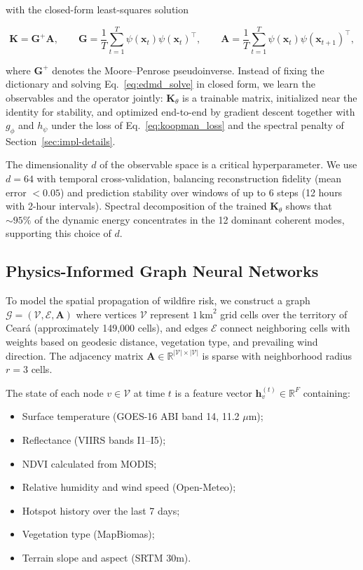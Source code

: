 \documentclass[preprint,12pt,times,numbers]{elsarticle}
\begin{document}
with the closed-form least-squares solution

\begin{equation}
\mathbf{K} = \mathbf{G}^{+} \mathbf{A}, \qquad
\mathbf{G} = \frac{1}{T}\sum_{t=1}^{T} \psi(\mathbf{x}_t)\psi(\mathbf{x}_t)^{\top}, \qquad
\mathbf{A} = \frac{1}{T}\sum_{t=1}^{T} \psi(\mathbf{x}_t)\psi(\mathbf{x}_{t+1})^{\top},
\label{eq:edmd_solve}
\end{equation}

where $\mathbf{G}^{+}$ denotes the Moore--Penrose pseudoinverse. Instead of fixing the dictionary and solving Eq.~\eqref{eq:edmd_solve} in closed form, we learn the observables and the operator jointly: $\mathbf{K}_\theta$ is a trainable matrix, initialized near the identity for stability, and optimized end-to-end by gradient descent together with $g_\phi$ and $h_\psi$ under the loss of Eq.~\eqref{eq:koopman_loss} and the spectral penalty of Section~\ref{sec:impl-details}.

The dimensionality $d$ of the observable space is a critical hyperparameter. We use $d = 64$ with temporal cross-validation, balancing reconstruction fidelity (mean error $< 0.05$) and prediction stability over windows of up to 6 steps (12 hours with 2-hour intervals). Spectral decomposition of the trained $\mathbf{K}_\theta$ shows that ${\sim}95\%$ of the dynamic energy concentrates in the 12 dominant coherent modes, supporting this choice of $d$.

\subsection{Physics-Informed Graph Neural Networks}
\label{sec:pignn}

To model the spatial propagation of wildfire risk, we construct a graph $\mathcal{G} = (\mathcal{V}, \mathcal{E}, \mathbf{A})$ where vertices $\mathcal{V}$ represent $1\ \text{km}^2$ grid cells over the territory of Ceará (approximately 149{,}000 cells), and edges $\mathcal{E}$ connect neighboring cells with weights based on geodesic distance, vegetation type, and prevailing wind direction. The adjacency matrix $\mathbf{A} \in \mathbb{R}^{|\mathcal{V}| \times |\mathcal{V}|}$ is sparse with neighborhood radius $r = 3$ cells.

The state of each node $v \in \mathcal{V}$ at time $t$ is a feature vector $\mathbf{h}_v^{(t)} \in \mathbb{R}^{F}$ containing:
\begin{itemize}
    \item Surface temperature (GOES-16 ABI band 14, 11.2 $\mu$m);
    \item Reflectance (VIIRS bands I1--I5);
    \item NDVI calculated from MODIS;
    \item Relative humidity and wind speed (Open-Meteo);
    \item Hotspot history over the last 7 days;
    \item Vegetation type (MapBiomas);
    \item Terrain slope and aspect (SRTM 30m).
\end{itemize}
\end{document}

